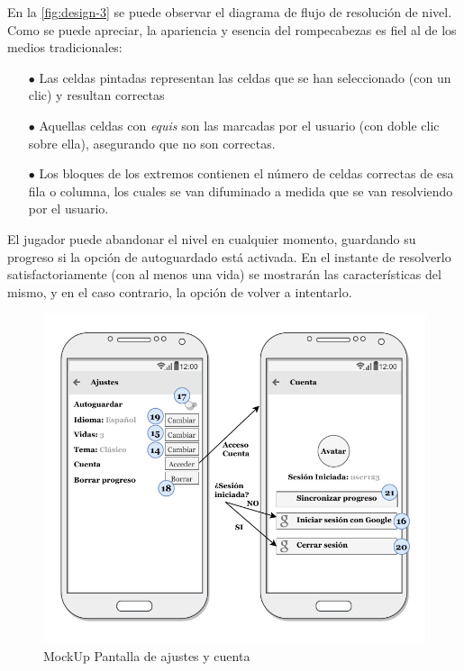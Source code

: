 En la  \autoref{fig:design-3} se puede observar el diagrama de flujo de resolución
de nivel. 
Como se puede apreciar, la apariencia y esencia del rompecabezas es fiel al de los medios tradicionales:

\begin{itemize}
  \item[$\bullet$] Las celdas pintadas representan las celdas que se han seleccionado (con un clic) y
  resultan correctas
  \item[$\bullet$] Aquellas celdas con \textit{equis} son las marcadas  por el
  usuario (con doble clic sobre ella), asegurando que no son correctas.
  \item[$\bullet$] Los bloques de los extremos contienen el número
  de celdas correctas de esa fila o columna, los cuales se van difuminado a medida que se van
  resolviendo por el usuario.
\end{itemize}

El jugador puede abandonar el nivel en cualquier momento, guardando su progreso si la opción de autoguardado
está activada. En el instante de resolverlo satisfactoriamente (con al menos una vida) se mostrarán
las características del mismo, y en el caso contrario, la opción de volver a intentarlo.

\begin{figure}[H]
  \centering
  \includegraphics[scale=0.83]{images/screen5.pdf}
  \caption{MockUp Pantalla de ajustes y cuenta}
  \label{fig:design-4}
\end{figure}

